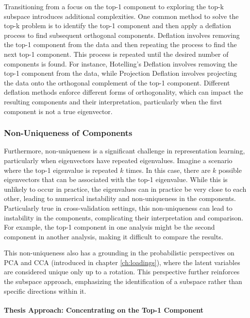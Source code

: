 Transitioning from a focus on the top-1 component to exploring the top-k subspace introduces additional complexities. One common method to solve the top-k problem is to identify the top-1 component and then apply a deflation process to find subsequent orthogonal components.
Deflation involves removing the top-1 component from the data and then repeating the process to find the next top-1 component. This process is repeated until the desired number of components is found.
For instance, Hotelling's Deflation \citep{hotelling1933analysis} involves removing the top-1 component from the data, while Projection Deflation \citep{mackey2008deflation} involves projecting the data onto the orthogonal complement of the top-1 component.
Different deflation methods enforce different forms of orthogonality, which can impact the resulting components and their interpretation, particularly when the first component is not a true eigenvector.

\subsubsection{Non-Uniqueness of Components}

Furthermore, non-uniqueness is a significant challenge in representation learning, particularly when eigenvectors have repeated eigenvalues. Imagine a scenario where the top-1 eigenvalue is repeated \(k\) times. In this case, there are \(k\) possible eigenvectors that can be associated with the top-1 eigenvalue. While this is unlikely to occur in practice, the eigenvalues can in practice be very close to each other, leading to numerical instability and non-uniqueness in the components. Particularly true in cross-validation settings, this non-uniqueness can lead to instability in the components, complicating their interpretation and comparison.
For example, the top-1 component in one analysis might be the second component in another analysis, making it difficult to compare the results.

This non-uniqueness also has a grounding in the probabilistic perspectives on PCA and CCA (introduced in chapter \ref{ch:loadings}), where the latent variables are considered unique only up to a rotation.
This perspective further reinforces the subspace approach, emphasizing the identification of a subspace rather than specific directions within it.

\paragraph{Thesis Approach: Concentrating on the Top-1 Component}

